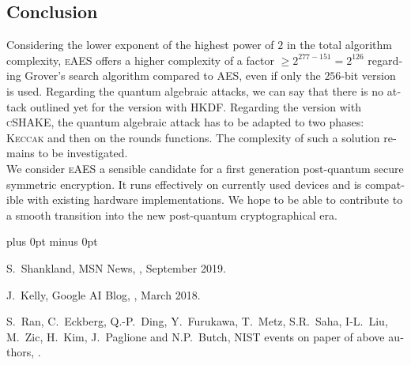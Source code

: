 \documentclass[a4paper,11pt]{article}
\begin{document}
\begin{otherlanguage}{english}
\section{Conclusion}

\noindent
Considering the lower exponent of the highest power of $2$ in the total algorithm complexity, \textsc{eAES} offers a higher complexity of a factor $\geq 2^{277-151}=2^{126}$ regarding Grover's search algorithm compared to  \textsc{AES}, even if only the $256$-bit version is used. Regarding the quantum algebraic attacks, we can say that there is no attack outlined yet for the version with \textsc{HKDF}. Regarding the version with \textsc{cSHAKE}, the quantum algebraic attack has to be adapted to two phases: \textsc{Keccak} and then on the rounds functions. The complexity of such a solution remains to be investigated.\\

\noindent
We consider \textsc{eAES} a sensible candidate for a first generation post-quantum secure symmetric encryption. It runs effectively on currently used devices and is compatible with existing hardware implementations. We hope to be able to contribute to a smooth transition into the new post-quantum cryptographical era.


\vspace{2cm}



\begin{thebibliography}{1}
\itemsep=0cm plus 0pt minus 0pt

  S.~Shankland,
  \newblock MSN News,
  , September 2019.

  J.~Kelly,
  \newblock Google AI Blog,
  , March 2018.

  S.~Ran, C.~Eckberg, Q.-P.~Ding, Y.~Furukawa, T.~Metz, S.R.~Saha, I-L.~Liu, M.~Zic, H.~Kim, J.~Paglione and N.P.~Butch,
  \newblock NIST events on paper of above authors,
  .


\end{thebibliography}
\end{otherlanguage}
\end{document}
